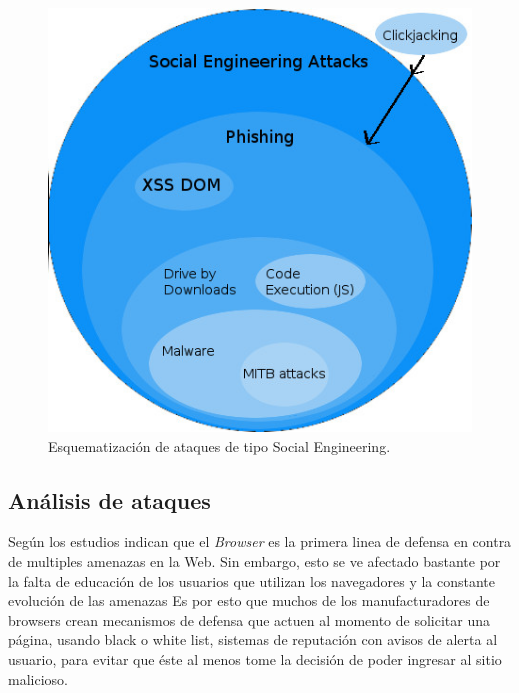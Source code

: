     \begin{figure}[h!t]
        \centering
        \includegraphics[scale=0.6]{figures/SEAttacks.jpg}
        \caption{Esquematización de ataques de tipo Social Engineering.}
        \label{fig:SEattack}
    \end{figure}

\subsection{Análisis de ataques}
    Según los estudios \cite{browSecPhish, Labs2013, rowSecSEMBlock} indican que el \textit{Browser} es la primera linea de defensa en contra de multiples amenazas en la Web. Sin embargo, esto se ve afectado bastante por la falta de educación de los usuarios que utilizan los navegadores y la constante evolución de las amenazas \cite{browSecPhish} Es por esto que muchos de los manufacturadores de browsers crean mecanismos de defensa \cite{Drake2011} que actuen al momento de solicitar una página, usando black o white list, sistemas de reputación \cite{Rajab2013} con avisos de alerta al usuario, para evitar que éste al menos tome la decisión de poder ingresar al sitio malicioso.

